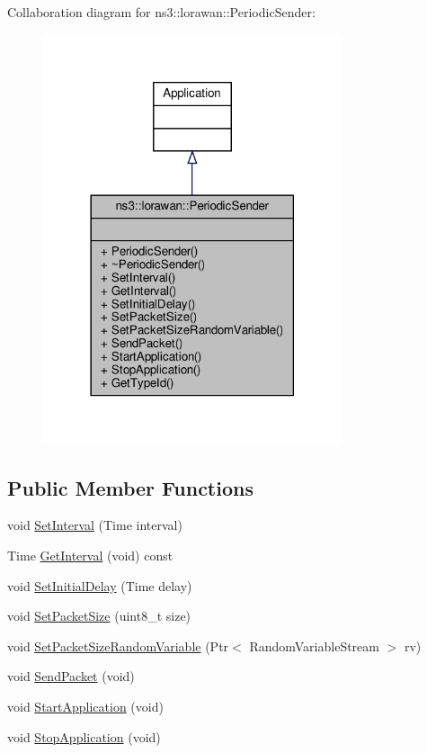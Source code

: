 Collaboration diagram for ns3\+:\+:lorawan\+:\+:Periodic\+Sender\+:
\nopagebreak
\begin{figure}[H]
\begin{center}
\leavevmode
\includegraphics[width=249pt]{classns3_1_1lorawan_1_1PeriodicSender__coll__graph}
\end{center}
\end{figure}
\subsection*{Public Member Functions}
\begin{DoxyCompactItemize}
\item 
void \hyperlink{classns3_1_1lorawan_1_1PeriodicSender_a5ae54a60c4d2a6436e2783ff6404d6dc}{Set\+Interval} (Time interval)
\item 
Time \hyperlink{classns3_1_1lorawan_1_1PeriodicSender_ada4dd99da2bf82acbaa9b3a02d6676a5}{Get\+Interval} (void) const
\item 
void \hyperlink{classns3_1_1lorawan_1_1PeriodicSender_a992bee380609c67ea6e7ab88acf7b303}{Set\+Initial\+Delay} (Time delay)
\item 
void \hyperlink{classns3_1_1lorawan_1_1PeriodicSender_a6ea783b6c4d403c241797ba7e48d1add}{Set\+Packet\+Size} (uint8\+\_\+t size)
\item 
void \hyperlink{classns3_1_1lorawan_1_1PeriodicSender_a9a6bddcb48fbb86baebc274369af795b}{Set\+Packet\+Size\+Random\+Variable} (Ptr$<$ Random\+Variable\+Stream $>$ rv)
\item 
void \hyperlink{classns3_1_1lorawan_1_1PeriodicSender_ad231ee52170822429c49d736d6976db1}{Send\+Packet} (void)
\item 
void \hyperlink{classns3_1_1lorawan_1_1PeriodicSender_a2afed0d82b89b2f1a2dc26c8b622a7dd}{Start\+Application} (void)
\item 
void \hyperlink{classns3_1_1lorawan_1_1PeriodicSender_aa71c1ba4b856a32bf14cc5e39a383ed1}{Stop\+Application} (void)
\end{DoxyCompactItemize}
